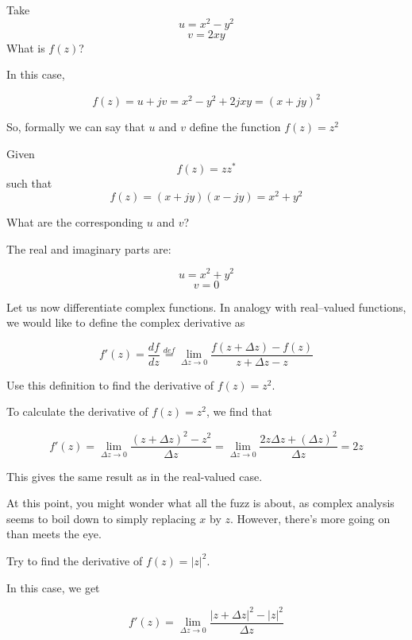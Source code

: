 \begin{cue}
Take
$$u = x^2 - y^2$$
$$v = 2 x y$$
What is $f(z)$?
\end{cue}

In this case,

$$f(z) = u + j v = x^2 - y^2 +2j x y = (x + jy)^2$$

So, formally we can say that $u$ and $v$ define the function $f(z) = z^2$

\begin{cue}
Given
$$f(z) = z z^* $$
such that
$$f(z) = (x + jy)(x - jy) = x^2 + y^2$$

What are the corresponding $u$ and $v$?
\end{cue}

The real and imaginary parts are:

$$u = x^2 + y^2$$
$$v = 0$$


\pagebreak



Let us now differentiate complex functions. In analogy with real--valued functions, we would like to define the complex derivative as

\begin{equation}
f' (z)=\frac{df}{dz} \stackrel{def}{=} \lim_{\Delta z \to 0} \frac{f(z+\Delta z) - f(z)}{z+\Delta z - z} \label{eq-deriv}
\end{equation} 

\begin{cue}
Use this definition to find the derivative of $f(z)=z^2$.
\end{cue}

To calculate the derivative of  $f(z)=z^2$, we find that

$$f'(z)=\lim_{\Delta z \to 0} \frac{(z+\Delta z)^2 - z^2}{\Delta z} = \lim_{\Delta z \to 0} \frac{2 z \Delta z + (\Delta z)^2}{\Delta z}=2z $$

This gives the same result as in the real-valued case.

At this point, you might wonder what all the fuzz is about, as complex analysis seems to boil down to simply replacing $x$ by $z$. However, there's more going on than meets the eye.

\begin{cue}
Try to find the derivative of $f(z)=|z|^2$.
\end{cue}

In this case, we get

$$f'(z)=\lim_{\Delta z \to 0} \frac{|z+\Delta z|^2 - |z|^2}{\Delta z} $$


